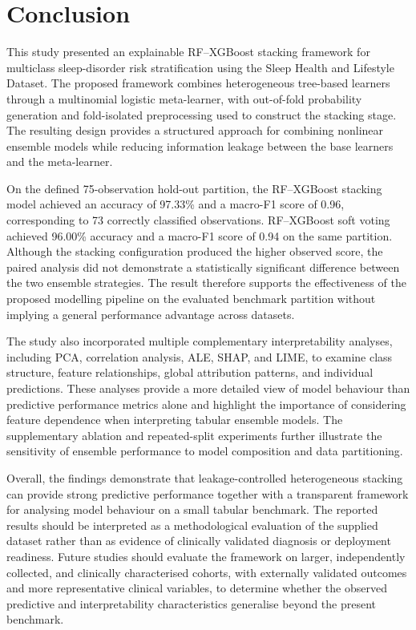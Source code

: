\documentclass[a4paper,fleqn]{cas-dc}
\begin{document}
\section{Conclusion}
\label{sec:conclusion}

This study presented an explainable RF--XGBoost stacking framework for multiclass sleep-disorder risk stratification using the Sleep Health and Lifestyle Dataset. The proposed framework combines heterogeneous tree-based learners through a multinomial logistic meta-learner, with out-of-fold probability generation and fold-isolated preprocessing used to construct the stacking stage. The resulting design provides a structured approach for combining nonlinear ensemble models while reducing information leakage between the base learners and the meta-learner.

On the defined 75-observation hold-out partition, the RF--XGBoost stacking model achieved an accuracy of 97.33\% and a macro-F1 score of 0.96, corresponding to 73 correctly classified observations. RF--XGBoost soft voting achieved 96.00\% accuracy and a macro-F1 score of 0.94 on the same partition. Although the stacking configuration produced the higher observed score, the paired analysis did not demonstrate a statistically significant difference between the two ensemble strategies. The result therefore supports the effectiveness of the proposed modelling pipeline on the evaluated benchmark partition without implying a general performance advantage across datasets.

The study also incorporated multiple complementary interpretability analyses, including PCA, correlation analysis, ALE, SHAP, and LIME, to examine class structure, feature relationships, global attribution patterns, and individual predictions. These analyses provide a more detailed view of model behaviour than predictive performance metrics alone and highlight the importance of considering feature dependence when interpreting tabular ensemble models. The supplementary ablation and repeated-split experiments further illustrate the sensitivity of ensemble performance to model composition and data partitioning.

Overall, the findings demonstrate that leakage-controlled heterogeneous stacking can provide strong predictive performance together with a transparent framework for analysing model behaviour on a small tabular benchmark. The reported results should be interpreted as a methodological evaluation of the supplied dataset rather than as evidence of clinically validated diagnosis or deployment readiness. Future studies should evaluate the framework on larger, independently collected, and clinically characterised cohorts, with externally validated outcomes and more representative clinical variables, to determine whether the observed predictive and interpretability characteristics generalise beyond the present benchmark.
\end{document}
